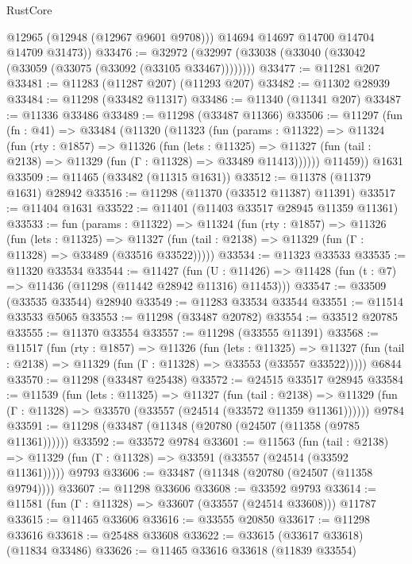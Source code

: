 \begin{lexlean}{RustCore}
\begin{coremodule}
          @12965
          (@12948 (@12967 @9601 @9708)))
        @14694
        @14697
        @14700
        @14704
        @14709
        @31473))
@33476 := @32972 (@32997 (@33038 (@33040 (@33042 (@33059 (@33075 (@33092 (@33105 @33467))))))))
@33477 := @11281 @207
@33481 := @11283 (@11287 @207) (@11293 @207)
@33482 := @11302 @28939
@33484 := @11298 (@33482 @11317)
@33486 := @11340 (@11341 @207)
@33487 := @11336 @33486
@33489 := @11298 (@33487 @11366)
@33506 := @11297
    (fun (fn : @41) =>
    @33484
      (@11320
        (@11323
          (fun (params : @11322) =>
          @11324
            (fun (rty : @1857) =>
            @11326
              (fun (lets : @11325) =>
              @11327 (fun (tail : @2138) => @11329 (fun (Γ : @11328) => @33489 @11413))))))
        @11459))
    @1631
@33509 := @11465 (@33482 (@11315 @1631))
@33512 := @11378 (@11379 @1631) @28942
@33516 := @11298 (@11370 (@33512 @11387) @11391)
@33517 := @11404 @1631
@33522 := @11401 (@11403 @33517 @28945 @11359 @11361)
@33533 := fun (params : @11322) =>
  @11324
    (fun (rty : @1857) =>
    @11326
      (fun (lets : @11325) =>
      @11327 (fun (tail : @2138) => @11329 (fun (Γ : @11328) => @33489 (@33516 @33522)))))
@33534 := @11323 @33533
@33535 := @11320 @33534
@33544 := @11427
    (fun (U : @11426) => @11428 (fun (t : @7) => @11436 (@11298 (@11442 @28942 @11316) @11453)))
@33547 := @33509 (@33535 @33544) @28940
@33549 := @11283 @33534 @33544
@33551 := @11514 @33533 @5065
@33553 := @11298 (@33487 @20782)
@33554 := @33512 @20785
@33555 := @11370 @33554
@33557 := @11298 (@33555 @11391)
@33568 := @11517
    (fun (rty : @1857) =>
    @11326
      (fun (lets : @11325) =>
      @11327 (fun (tail : @2138) => @11329 (fun (Γ : @11328) => @33553 (@33557 @33522)))))
    @6844
@33570 := @11298 (@33487 @25438)
@33572 := @24515 @33517 @28945
@33584 := @11539
    (fun (lets : @11325) =>
    @11327
      (fun (tail : @2138) =>
      @11329 (fun (Γ : @11328) => @33570 (@33557 (@24514 (@33572 @11359 @11361))))))
    @9784
@33591 := @11298 (@33487 (@11348 (@20780 (@24507 (@11358 (@9785 @11361))))))
@33592 := @33572 @9784
@33601 := @11563
    (fun (tail : @2138) => @11329 (fun (Γ : @11328) => @33591 (@33557 (@24514 (@33592 @11361)))))
    @9793
@33606 := @33487 (@11348 (@20780 (@24507 (@11358 @9794))))
@33607 := @11298 @33606
@33608 := @33592 @9793
@33614 := @11581 (fun (Γ : @11328) => @33607 (@33557 (@24514 @33608))) @11787
@33615 := @11465 @33606
@33616 := @33555 @20850
@33617 := @11298 @33616
@33618 := @25488 @33608
@33622 := @33615 (@33617 @33618) (@11834 @33486)
@33626 := @11465 @33616 @33618 (@11839 @33554)

\end{coremodule}
\end{lexlean}
